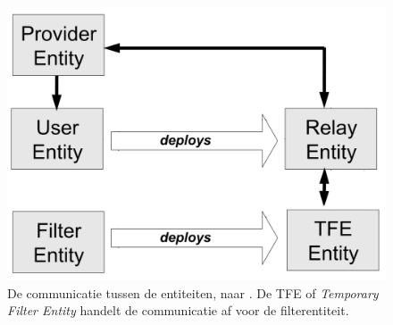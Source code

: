 \begin{figure}[htpb]   
    \label{Figuur::anon}      
  \begin{center}    
 \includegraphics[scale=0.25]{fig/anon}    
  \end{center}   
  \caption{De communicatie tussen de entiteiten, naar \cite{CisseeAAP}. De TFE of \emph{Temporary Filter Entity} handelt de communicatie af voor de filterentiteit.}  
   \end{figure}

